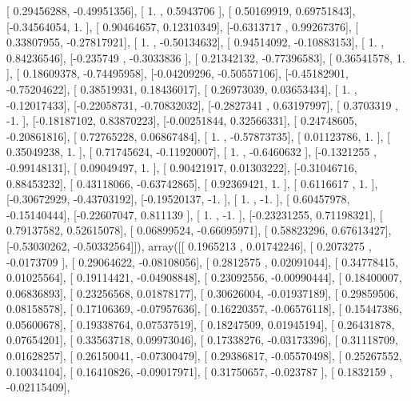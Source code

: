 \documentclass{article}
\begin{document}
       [ 0.29456288, -0.49951356],
       [ 1.        ,  0.5943706 ],
       [ 0.50169919,  0.69751843],
       [-0.34564054,  1.        ],
       [ 0.90464657,  0.12310349],
       [-0.6313717 ,  0.99267376],
       [ 0.33807955, -0.27817921],
       [ 1.        , -0.50134632],
       [ 0.94514092, -0.10883153],
       [ 1.        ,  0.84236546],
       [-0.235749  , -0.3033836 ],
       [ 0.21342132, -0.77396583],
       [ 0.36541578,  1.        ],
       [ 0.18609378, -0.74495958],
       [-0.04209296, -0.50557106],
       [-0.45182901, -0.75204622],
       [ 0.38519931,  0.18436017],
       [ 0.26973039,  0.03653434],
       [ 1.        , -0.12017433],
       [-0.22058731, -0.70832032],
       [-0.2827341 ,  0.63197997],
       [ 0.3703319 , -1.        ],
       [-0.18187102,  0.83870223],
       [-0.00251844,  0.32566331],
       [ 0.24748605, -0.20861816],
       [ 0.72765228,  0.06867484],
       [ 1.        , -0.57873735],
       [ 0.01123786,  1.        ],
       [ 0.35049238,  1.        ],
       [ 0.71745624, -0.11920007],
       [ 1.        , -0.6460632 ],
       [-0.1321255 , -0.99148131],
       [ 0.09049497,  1.        ],
       [ 0.90421917,  0.01303222],
       [-0.31046716,  0.88453232],
       [ 0.43118066, -0.63742865],
       [ 0.92369421,  1.        ],
       [ 0.6116617 ,  1.        ],
       [-0.30672929, -0.43703192],
       [-0.19520137, -1.        ],
       [ 1.        , -1.        ],
       [ 0.60457978, -0.15140444],
       [-0.22607047,  0.811139  ],
       [ 1.        , -1.        ],
       [-0.23231255,  0.71198321],
       [ 0.79137582,  0.52615078],
       [ 0.06899524, -0.66095971],
       [ 0.58823296,  0.67613427],
       [-0.53030262, -0.50332564]]), array([[ 0.1965213 ,  0.01742246],
       [ 0.2073275 , -0.0173709 ],
       [ 0.29064622, -0.08108056],
       [ 0.2812575 ,  0.02091044],
       [ 0.34778415,  0.01025564],
       [ 0.19114421, -0.04908848],
       [ 0.23092556, -0.00990444],
       [ 0.18400007,  0.06836893],
       [ 0.23256568,  0.01878177],
       [ 0.30626004, -0.01937189],
       [ 0.29859506,  0.08158578],
       [ 0.17106369, -0.07957636],
       [ 0.16220357, -0.06576118],
       [ 0.15447386,  0.05600678],
       [ 0.19338764,  0.07537519],
       [ 0.18247509,  0.01945194],
       [ 0.26431878,  0.07654201],
       [ 0.33563718,  0.09973046],
       [ 0.17338276, -0.03173396],
       [ 0.31118709,  0.01628257],
       [ 0.26150041, -0.07300479],
       [ 0.29386817, -0.05570498],
       [ 0.25267552,  0.10034104],
       [ 0.16410826, -0.09017971],
       [ 0.31750657, -0.023787  ],
       [ 0.1832159 , -0.02115409],
\end{document}
